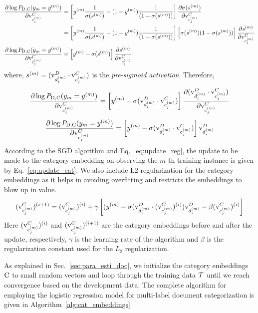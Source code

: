 \begin{align}
\frac{\partial \log P_{\mathrm{D}, \mathrm{C}}(y_{m}=y^{(m)})} {\partial \mathrm{v}^{C}_{c^{(m)}_{j}}} &= \left[ y^{(m)}\frac{1}{\sigma(s^{(m)})} - (1-y^{(m)})\frac{1}{(1 - \sigma(s^{(m)}))}\right] \frac{\partial \sigma(s^{(m)})}{\partial \mathrm{v}^{C}_{c^{(m)}_{j}}} \\
&= \left[ y^{(m)}\frac{1}{\sigma(s^{(m)})} - (1-y^{(m)})\frac{1}{(1 - \sigma(s^{(m)}))}\right] \left[\sigma(s^{(m)})(1-\sigma(s^{(m)}))\right]\frac{\partial s^{(m)}}{\partial \mathrm{v}^{C}_{c^{(m)}_{j}}} \\
\frac{\partial \log P_{\mathrm{D}, \mathrm{C}}(y_{m}=y^{(m)})} {\partial \mathrm{v}^{C}_{c^{(m)}_{j}}} &= \left[ y^{(m)} - \sigma(s^{(m)})\right] \frac{\partial s^{(m)}}{\partial \mathrm{v}^{C}_{c^{(m)}_{j}}}
\end{align}
where, $s^{(m)} = (\mathrm{v}^{D}_{d^{(m)}_{i}}\cdot \mathrm{v}^{C}_{c^{(m)}_{j}})$ is the \emph{pre-sigmoid activation}. Therefore,
\begin{equation}
\frac{\partial \log P_{\mathrm{D}, \mathrm{C}}(y_{m}=y^{(m)})} {\partial \mathrm{v}^{C}_{c^{(m)}_{j}}} = \left[ y^{(m)} - \sigma(\mathrm{v}^{D}_{d^{(m)}_{i}}\cdot \mathrm{v}^{C}_{c^{(m)}_{j}})\right] \frac{\partial (\mathrm{v}^{D}_{d^{(m)}_{i}}\cdot \mathrm{v}^{C}_{c^{(m)}_{j}})}{\partial \mathrm{v}^{C}_{c^{(m)}_{j}}}
\end{equation}
\begin{equation}
\label{eq:grad_c}
\frac{\partial \log P_{\mathrm{D}, \mathrm{C}}(y_{m}=y^{(m)})} {\partial \mathrm{v}^{C}_{c^{(m)}_{j}}} = \left[ y^{(m)} - \sigma(\mathrm{v}^{D}_{d^{(m)}_{i}}\cdot \mathrm{v}^{C}_{c^{(m)}_{j}})\right] \mathrm{v}^{D}_{d^{(m)}_{i}}
\end{equation}
According to the SGD algorithm and Eq.~\ref{eq:update_reg}, the update to be made to the category embedding on observing the $m$-th training instance is given by Eq.~\ref{eq:update_cat}. We also include L2
regularization for the category embeddings as it helps in avoiding overfitting and restricts the embeddings to blow up in value.
\begin{equation}
\label{eq:update_cat}
(\mathrm{v}^{C}_{c^{(m)}_{j}})^{(i+1)} = (\mathrm{v}^{C}_{c^{(m)}_{j}})^{(i)} + \gamma \left[ ( y^{(m)} - \sigma(\mathrm{v}^{D}_{d^{(m)}_{i}}\cdot (\mathrm{v}^{C}_{c^{(m)}_{j}})^{(i)}) \mathrm{v}^{D}_{d^{(m)}_{i}} -\beta(\mathrm{v}^{C}_{c^{(m)}_{j}})^{(i)} \right]
\end{equation}
Here $(\mathrm{v}^{C}_{c^{(m)}_{j}})^{(i)}$ and $(\mathrm{v}^{C}_{c^{(m)}_{j}})^{(i+1)}$ are the category embeddings before and after the update, respectively, $\gamma$ is the learning rate of the algorithm and $\beta$ is the regularization constant used for the $L_{2}$ regularization. 

As explained in Sec.~\ref{sec:para_esti_doc}, we initialize the category embeddings $\mathrm{C}$ to small random vectors and loop through the training data $\mathcal{T}$ until we reach convergence based on the development data. The complete algorithm for employing the logistic regression model for multi-label document categorization is given in Algorithm~\ref{alg:cat_embeddings}

